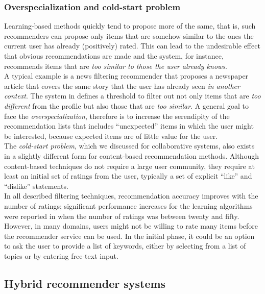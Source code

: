 \subsubsection{Overspecialization and cold-start problem}
\label{overspecialization}

Learning-based methods quickly tend to propose
more of the same, that is, such recommenders can propose only items
that are somehow similar to the ones the current user has already
(positively) rated. This can lead to the undesirable effect that
obvious recommendations are made and the system, for instance,
recommends items that are \textit{too similar to those the user already knows}.
\\A typical example is a news filtering recommender that proposes a
newspaper article that covers the same story that the user has already
seen \textit{in another context}. The system in \cite{billsus1999personal} 
defines a threshold to filter out not only items that
are \textit{too different} from the profile but also those that are \textit{too
similar}. A general goal to face the \textit{overspecialization},
therefore is to increase the serendipity of the recommendation lists
that includes “unexpected” items in which the user might be
interested, because expected items are of little value for the user.\\
The \textit{cold-start problem}, which we discussed for collaborative
systems, also exists in a slightly different form for content-based
recommendation methods. Although content-based techniques do not
require a large user community, they require at least an initial set
of ratings from the user, typically a set of explicit “like” and
“dislike” statements. \\In all described filtering techniques,
recommendation accuracy improves with the number of ratings;
significant performance increases for the learning algorithms were
reported in \cite{pazzani1997learning}  when the number of ratings was
between twenty and fifty. \\However, in many domains, users might not be
willing to rate many items before the recommender service can be
used. In the initial phase, it could be an option to ask the user to
provide a list of keywords, either by selecting from a list of topics
or by entering free-text input.

\subsection{Hybrid recommender systems} 

